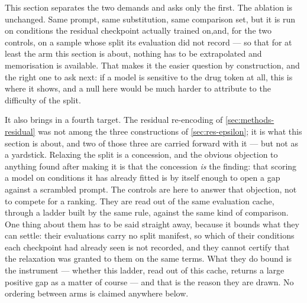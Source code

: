 This section separates the two demands and asks only the first. The ablation is
unchanged. Same prompt, same substitution, same comparison set, but it is
run on conditions the residual checkpoint actually trained on,and, for the two
controls, on a sample whose split its evaluation did not record --- so that for at
least the arm this section is about, nothing has to be extrapolated and
memorisation is available. That makes it the easier question by
construction, and the right one to ask next: if a model is sensitive to the drug
token at all, this is where it shows, and a null here would be much harder to
attribute to the difficulty of the split.

It also brings in a fourth target. The residual re-encoding of
\cref{sec:methods-residual} was not among the three constructions of
\cref{sec:res-epsilon}; it is what this section is about, and two of those three
are carried forward with it --- but not as a yardstick. Relaxing the split is a
concession, and the obvious objection to anything found after making it is that
the concession \emph{is} the finding: that scoring a model on conditions it has
already fitted is by itself enough to open a gap against a scrambled prompt. The
controls are here to answer that objection, not to compete for a ranking. They are
read out of the same evaluation cache, through a ladder built by the same rule,
against the same kind of comparison. One thing about them has to be said straight
away, because it bounds what they can settle: their evaluations carry no split
manifest, so which of their conditions each checkpoint had already seen is not
recorded, and they cannot certify that the relaxation was granted to them on the
same terms. What they do bound is the instrument --- whether this ladder, read out
of this cache, returns a large positive gap as a matter of course --- and that is
the reason they are drawn. No ordering between arms is claimed anywhere below.

